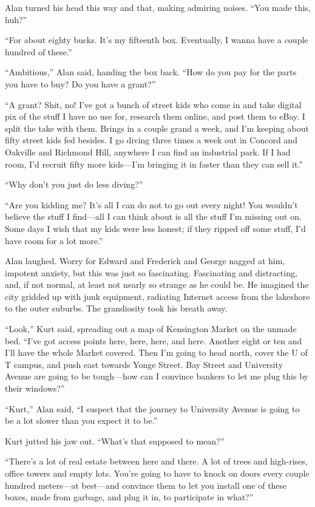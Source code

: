 \documentclass{article}
\begin{document}
Alan turned his head this way and that, making admiring noises.  ``You
made this, huh?''

``For about eighty bucks.  It's my fifteenth box.  Eventually, I wanna
have a couple hundred of these.''

``Ambitious,'' Alan said, handing the box back.  ``How do you pay for
the parts you have to buy?  Do you have a grant?''

``A grant?  Shit, no!  I've got a bunch of street kids who come in and
take digital pix of the stuff I have no use for, research them online,
and post them to eBay.  I split the take with them.  Brings in a
couple grand a week, and I'm keeping about fifty street kids fed
besides.  I go diving three times a week out in Concord and Oakville
and Richmond Hill, anywhere I can find an industrial park.  If I had
room, I'd recruit fifty more kids---I'm bringing it in faster than
they can sell it.''

``Why don't you just do less diving?''

``Are you kidding me?  It's all I can do not to go out every night! 
You wouldn't believe the stuff I find---all I can think about is all
the stuff I'm missing out on.  Some days I wish that my kids were less
honest; if they ripped off some stuff, I'd have room for a lot more.''

Alan laughed.  Worry for Edward and Frederick and George nagged at
him, impotent anxiety, but this was just so fascinating.  Fascinating
and distracting, and, if not normal, at least not nearly so strange as
he could be.  He imagined the city gridded up with junk equipment,
radiating Internet access from the lakeshore to the outer suburbs. 
The grandiosity took his breath away.

``Look,'' Kurt said, spreading out a map of Kensington Market on the
unmade bed.  ``I've got access points here, here, here, and here. 
Another eight or ten and I'll have the whole Market covered.  Then I'm
going to head north, cover the U of T campus, and push east towards
Yonge Street.  Bay Street and University Avenue are going to be
tough---how can I convince bankers to let me plug this by their
windows?''

``Kurt,'' Alan said, ``I suspect that the journey to University Avenue
is going to be a lot slower than you expect it to be.''

Kurt jutted his jaw out.  ``What's that supposed to mean?''

``There's a lot of real estate between here and there.  A lot of trees
and high-rises, office towers and empty lots.  You're going to have to
knock on doors every couple hundred meters---at best---and convince
them to let you install one of these boxes, made from garbage, and
plug it in, to participate in what?''
\end{document}
